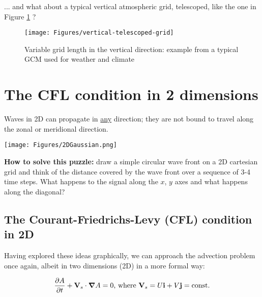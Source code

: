 ... and what about a typical vertical atmospheric grid, telescoped, like the one in Figure \ref{vertical-grid-stretch} ?

\begin{figure}[h!]
	\begin{center}
	\texttt{[image: Figures/vertical-telescoped-grid]}
	\end{center}
	\caption{Variable grid length in the vertical direction: example from a typical GCM used for weather and climate}
	\label{vertical-grid-stretch}
\end{figure}

\clearpage

\section{The CFL condition in 2 dimensions}

Waves in 2D can propagate in \underline{any} direction; they are not bound to travel along the zonal or meridional direction.

\begin{center}
	\texttt{[image: Figures/2DGaussian.png]}
\end{center}

\vspace{2em}
\vspace{2em}
	
{\bf How to solve this puzzle:} draw a simple circular wave front on a 2D cartesian grid and think of the distance covered by the wave front over a sequence of 3-4 time steps.
What happens to the signal along the $x$, $y$ axes and what happens along the diagonal?

\subsection{The Courant-Friedrichs-Levy (CFL) condition in 2D}

	Having explored these ideas graphically, we can approach the advection problem once again, albeit in two dimensions (2D) in a more formal way:
	
	\begin{equation}
		\frac{\partial A}{\partial t} + \mathbf{V}_s \cdot \mbox{\boldmath $\nabla$}{A} = 0 \textrm{, where } \mathbf{V}_s=U\mathbf{i}+V\mathbf{j} = \textrm{const.}
	\end{equation}
	

